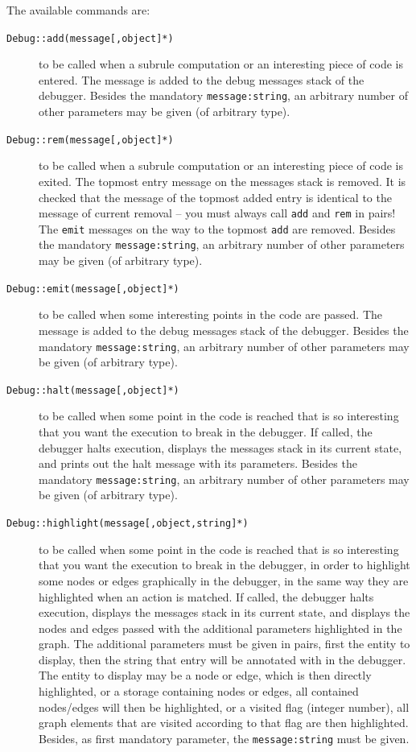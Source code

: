 The available commands are:
\begin{description}
\item[\texttt{Debug::add(message[,object]*)}] to be called when a subrule computation or an interesting piece of code is entered.
The message is added to the debug messages stack of the debugger.
Besides the mandatory \texttt{message:string}, an arbitrary number of other parameters may be given (of arbitrary type).
\item[\texttt{Debug::rem(message[,object]*)}] to be called when a subrule computation or an interesting piece of code is exited.
The topmost entry message on the messages stack is removed.
It is checked that the message of the topmost added entry is identical to the message of current removal -- you must always call \texttt{add} and \texttt{rem} in pairs!
The \texttt{emit} messages on the way to the topmost \texttt{add} are removed. 
Besides the mandatory \texttt{message:string}, an arbitrary number of other parameters may be given (of arbitrary type).
\item[\texttt{Debug::emit(message[,object]*)}] to be called when some interesting points in the code are passed.
The message is added to the debug messages stack of the debugger.
Besides the mandatory \texttt{message:string}, an arbitrary number of other parameters may be given (of arbitrary type).
\item[\texttt{Debug::halt(message[,object]*)}] to be called when some point in the code is reached that is so interesting that you want the execution to break in the debugger. 
If called, the debugger halts execution, displays the messages stack in its current state, and prints out the halt message with its parameters.
Besides the mandatory \texttt{message:string}, an arbitrary number of other parameters may be given (of arbitrary type).
\item[\texttt{Debug::highlight(message[,object,string]*)}] to be called when some point in the code is reached that is so interesting that you want the execution to break in the debugger, 
in order to highlight some nodes or edges graphically in the debugger, in the same way they are highlighted when an action is matched.
If called, the debugger halts execution, displays the messages stack in its current state, and displays the nodes and edges passed with the additional parameters highlighted in the graph.
The additional parameters must be given in pairs, first the entity to display, then the string that entry will be annotated with in the debugger.
The entity to display may be a node or edge, which is then directly highlighted,
or a storage containing nodes or edges, all contained nodes/edges will then be highlighted,
or a visited flag (integer number), all graph elements that are visited according to that flag are then highlighted.
Besides, as first mandatory parameter, the \texttt{message:string} must be given.
\end{description}

